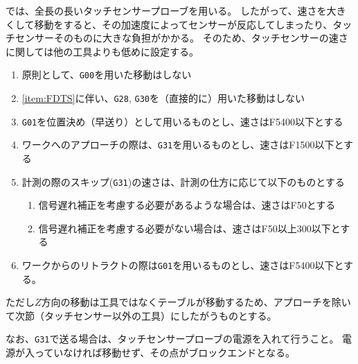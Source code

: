 \clearpage
\DMname では、全長の長いタッチセンサープローブを用いる。
したがって、速さを大きくして移動をすると、その加速度によってセンサーが反応してしまったり、タッチセンサーそのものに大きな負担がかかる。
そのため、タッチセンサーの速さに関しては他の工具よりも低めに設定する。
\begin{enumerate}[label=\Roman*., ref=\Roman*]
\item \label{item:FDTS} 原則として、\verb|G00|を用いた移動はしない
\item \ref{item:FDTS}に伴い、\verb|G28|, \verb|G30|を（直接的に）用いた移動はしない
\item \verb|G01|を位置決め（早送り）として用いるものとし、速さはF5400以下とする
\item ワークへのアプローチの際は、\verb|G31|を用いるものとし、速さはF1500以下とする
\item 計測の際のスキップ(\verb|G31|)の速さは、計測の仕方に応じて以下のものとする
  \begin{enumerate}
  \item {}信号遅れ補正を考慮する必要があるような場合は、速さはF50とする
  \item 信号遅れ補正を考慮する必要がない場合は、速さはF50以上300以下とする
  \end{enumerate}
\item ワークからのリトラクトの際は\verb|G01|を用いるものとし、速さはF5400以下とする。
\end{enumerate}
ただし$Z$方向の移動は工具ではなくテーブルが移動するため、アプローチを除いて次節（タッチセンサー以外の工具）にしたがうものとする。

なお、\verb|G31|で送る場合は、タッチセンサープローブの電源を入れて行うこと。
電源が入っていなければ移動せず、その点がブロックエンドとなる。



